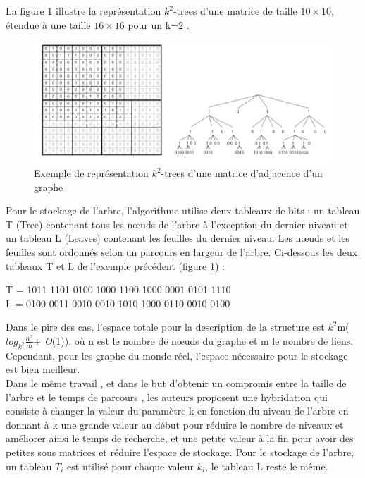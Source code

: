 La figure \ref{k2-trees-exemples} illustre la représentation $k^2$-trees d'une matrice de taille $10 \times 10$, étendue à une  taille $16 \times 16$ pour un k=2 \citep{brisaboa2015efficient}.

\begin{figure}[H]
\begin{center}
\includegraphics[height=200 pt, width=450 pt]{./ressources/image/k2-trees.png} 
\end{center}
\caption{Exemple de représentation $k^2$-trees d'une matrice d'adjacence d'un graphe}
\label{k2-trees-exemples}
\end{figure}


Pour le stockage de l'arbre, l'algorithme utilise deux tableaux de bits : un tableau T (Tree) contenant tous les nœuds de l'arbre à l'exception du dernier niveau et un tableau L (Leaves) contenant les feuilles du dernier niveau. Les nœuds et les feuilles sont ordonnés selon un parcours en largeur de l'arbre.   
Ci-dessous les deux tableaux T et L de l'exemple précédent (figure \ref{k2-trees-exemples}) : \\
\begin{center}
	T = 1011 1101 0100 1000 1100 1000 0001 0101 1110\\
	L = 0100 0011 0010 0010 1010 1000 0110 0010 0100\\	
\end{center}
Dans le pire des cas, l'espace totale pour la description de la structure est $k^2$m($log_{k^2}\frac{n^2}{m}$+ \textit{O}(1)), où n est le nombre de nœuds du graphe et m le nombre de liens. Cependant, pour les graphe du monde réel, l'espace nécessaire pour le stockage est bien meilleur. \\

Dans le même travail \citep{brisaboa2009k}, et dans le but d'obtenir un compromis entre la taille de l'arbre et le temps de parcours , les auteurs proposent une hybridation qui consiste à changer la valeur du paramètre k en fonction du niveau de l'arbre en donnant à k une grande valeur au début pour réduire le nombre de niveaux et améliorer ainsi le temps de recherche, et une petite valeur à la fin pour avoir des petites sous matrices et réduire l'espace de stockage.
Pour le stockage de l'arbre, un tableau $T_{i}$ est utilisé pour chaque valeur $k_{i}$, le tableau L reste le même.\\

